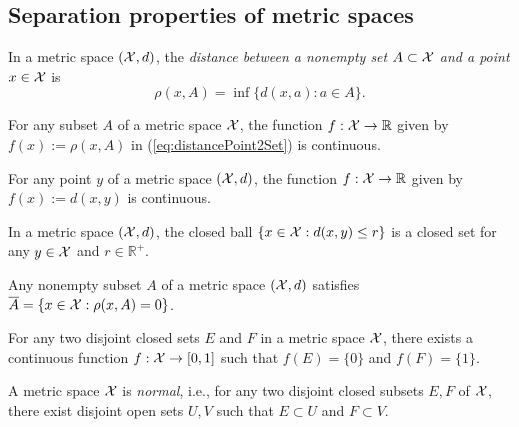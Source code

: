 \subsection{Separation properties of metric spaces}
\label{sec:separ-prop}

\begin{defn}
  \label{def:distPointAndSet}
  In a metric space $({\cal X},d)$, 
  the \emph{distance between a nonempty set $A\subset {\cal X}$
    and a point $x\in {\cal X}$} is
  \begin{equation}
    \label{eq:distancePoint2Set}
    \rho(x,A) = \inf\{d(x,a): a\in A\}.
  \end{equation}
\end{defn}

\begin{lem}
  \label{lem:distPointAndSetContinuous}
  For any subset $A$ of a metric space ${\cal X}$,
  the function $f: {\cal X}\rightarrow \mathbb{R}$
  given by $f(x):= \rho(x,A)$
  in (\ref{eq:distancePoint2Set}) is continuous.
\end{lem}

\begin{coro}
  \label{coro:metricContinuous}
  For any point $y$ of a metric space $({\cal X},d)$,
  the function $f: {\cal X}\rightarrow \mathbb{R}$
  given by $f(x):= d(x,y)$ is continuous.
\end{coro}

\begin{coro}
  \label{coro:closedBallIsClosed}
  In a metric space $({\cal X},d)$,
  the closed ball $\{x\in{\cal X}: d(x,y)\le r\}$
  is a closed set for any $y\in {\cal X}$ and $r\in\mathbb{R}^+$.
\end{coro}

\begin{lem}
  \label{lem:defineClosureFromDistance}
  Any nonempty subset $A$ of a metric space $({\cal X},d)$
  satisfies $\overline{A}=\{x\in{\cal X}: \rho(x,A)=0\}$.
\end{lem}

\begin{lem}
  \label{lem:separateClosedSets}
  For any two disjoint closed sets $E$ and $F$
  in a metric space ${\cal X}$,
  there exists a continuous function $f:{\cal X}\rightarrow [0,1]$
  such that $f(E)=\{0\}$ and $f(F)=\{1\}$.
\end{lem}

\begin{coro}
  \label{coro:metricSpaceIsNormal}
  A metric space ${\cal X}$ is \emph{normal},
  i.e., 
  for any two disjoint closed subsets $E,F$ of ${\cal X}$,
  there exist disjoint open sets $U,V$
  such that $E\subset U$ and $F\subset V$.
\end{coro}


